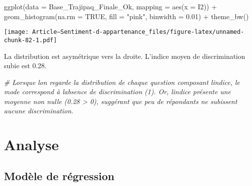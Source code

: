 \documentclass[
]{article}
\newenvironment{Shaded}{\begin{snugshade}}{\end{snugshade}}
\newcommand{\AttributeTok}[1]{\textcolor[rgb]{0.77,0.63,0.00}{#1}}
\newcommand{\CommentTok}[1]{\textcolor[rgb]{0.56,0.35,0.01}{\textit{#1}}}
\newcommand{\ConstantTok}[1]{\textcolor[rgb]{0.00,0.00,0.00}{#1}}
\newcommand{\FloatTok}[1]{\textcolor[rgb]{0.00,0.00,0.81}{#1}}
\newcommand{\FunctionTok}[1]{\textcolor[rgb]{0.00,0.00,0.00}{#1}}
\newcommand{\NormalTok}[1]{#1}
\newcommand{\SpecialCharTok}[1]{\textcolor[rgb]{0.00,0.00,0.00}{#1}}
\newcommand{\StringTok}[1]{\textcolor[rgb]{0.31,0.60,0.02}{#1}}
\begin{document}
\begin{Shaded}
\begin{Highlighting}[]
\FunctionTok{ggplot}\NormalTok{(}\AttributeTok{data =}\NormalTok{ Base\_Trajipaq\_Finale\_Ok, }\AttributeTok{mapping =} \FunctionTok{aes}\NormalTok{(}\AttributeTok{x =}\NormalTok{ I2)) }\SpecialCharTok{+}
  \FunctionTok{geom\_histogram}\NormalTok{(}\AttributeTok{na.rm =} \ConstantTok{TRUE}\NormalTok{, }\AttributeTok{fill =} \StringTok{"pink"}\NormalTok{, }\AttributeTok{binwidth =} \FloatTok{0.01}\NormalTok{) }\SpecialCharTok{+}
  \FunctionTok{theme\_bw}\NormalTok{()}
\end{Highlighting}
\end{Shaded}

\texttt{[image: Article---Sentiment-d-appartenance\_files/figure-latex/unnamed-chunk-82-1.pdf]}

La distribution est asymétrique vers la droite. L'indice moyen de
discrimination subie est 0.28.

\begin{Shaded}
\begin{Highlighting}[]
\CommentTok{\# Lorsque l\textquotesingle{}on regarde la distribution de chaque question composant l\textquotesingle{}indice, le mode correspond à l\textquotesingle{}absence de discrimination (1). Or, l\textquotesingle{}indice présente une moyenne non nulle (0.28 \textgreater{} 0), suggérant que peu de répondants ne subissent aucune discrimination.}
\end{Highlighting}
\end{Shaded}

\hypertarget{analyse}{%
\section{Analyse}\label{analyse}}

\hypertarget{moduxe8le-de-ruxe9gression}{%
\subsection{Modèle de régression}\label{moduxe8le-de-ruxe9gression}}
\end{document}
